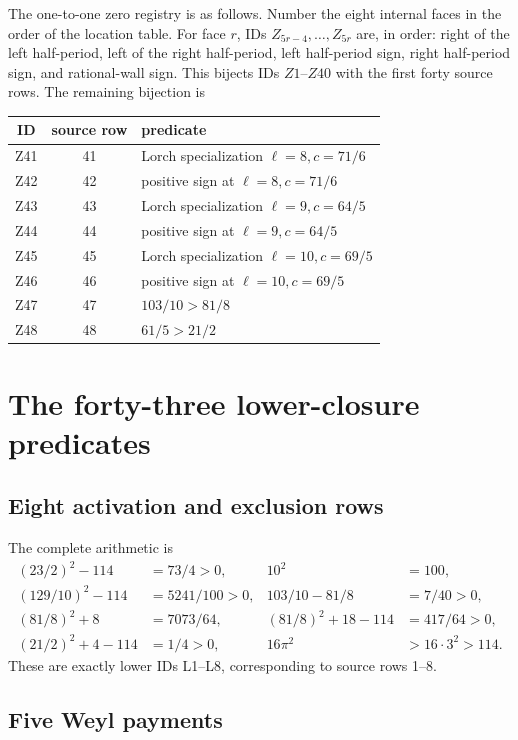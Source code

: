 \documentclass[11pt]{article}
\begin{document}
The one-to-one zero registry is as follows.  Number the eight internal
faces in the order of the location table.  For face \(r\), IDs
\(Z_{5r-4},\ldots,Z_{5r}\) are, in order: right of the left half-period,
left of the right half-period, left half-period sign, right half-period
sign, and rational-wall sign.  This bijects IDs \(Z1\)--\(Z40\) with the
first forty source rows.  The remaining bijection is
\begin{center}
\small
\begin{tabular}{c|c|l}
\toprule
ID&source row&predicate\\
\midrule
Z41&41&Lorch specialization \(\ell=8,c=71/6\)\\
Z42&42&positive sign at \(\ell=8,c=71/6\)\\
Z43&43&Lorch specialization \(\ell=9,c=64/5\)\\
Z44&44&positive sign at \(\ell=9,c=64/5\)\\
Z45&45&Lorch specialization \(\ell=10,c=69/5\)\\
Z46&46&positive sign at \(\ell=10,c=69/5\)\\
Z47&47&\(103/10>81/8\)\\
Z48&48&\(61/5>21/2\)\\
\bottomrule
\end{tabular}
\end{center}

\section{The forty-three lower-closure predicates}

\subsection{Eight activation and exclusion rows}

The complete arithmetic is
\begin{align*}
 (23/2)^2-114&=73/4>0,&10^2&=100,\\
 (129/10)^2-114&=5241/100>0,
 &103/10-81/8&=7/40>0,\\
 (81/8)^2+8&=7073/64,
 &(81/8)^2+18-114&=417/64>0,\\
 (21/2)^2+4-114&=1/4>0,
 &16\pi^2&>16\cdot3^2>114.
\end{align*}
These are exactly lower IDs L1--L8, corresponding to source rows 1--8.

\subsection{Five Weyl payments}
\end{document}
